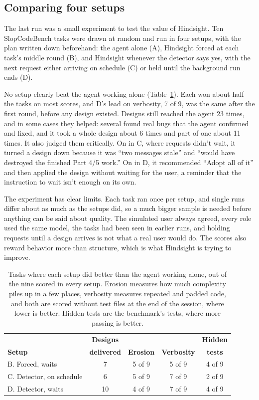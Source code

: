 \subsection{Comparing four setups}

The last run was a small experiment to test the value of Hindsight. Ten SlopCodeBench tasks were drawn at random and run in four setups, with the plan written down beforehand: the agent alone (A), Hindsight forced at each task's middle round (B), and Hindsight whenever the detector says yes, with the next request either arriving on schedule (C) or held until the background run ends (D).

No setup clearly beat the agent working alone (Table~\ref{tab:compare}). Each won about half the tasks on most scores, and D's lead on verbosity, 7 of 9, was the same after the first round, before any design existed. Designs still reached the agent 23 times, and in some cases they helped: several found real bugs that the agent confirmed and fixed, and it took a whole design about 6 times and part of one about 11 times. It also judged them critically. On  in C, where requests didn't wait, it turned a design down because it was ``two messages stale'' and ``would have destroyed the finished Part 4/5 work.'' On  in D, it recommended ``Adopt all of it'' and then applied the design without waiting for the user, a reminder that the instruction to wait isn't enough on its own.

The experiment has clear limits. Each task ran once per setup, and single runs differ about as much as the setups did, so a much bigger sample is needed before anything can be said about quality. The simulated user always agreed, every role used the same model, the tasks had been seen in earlier runs, and holding requests until a design arrives is not what a real user would do. The scores also reward behavior more than structure, which is what Hindsight is trying to improve.

\begin{table}[t]
  \centering
  \small
  \begin{tabular}{@{}l c c c c@{}}
    \toprule
    & \textbf{Designs} & & & \textbf{Hidden} \\
    \textbf{Setup} & \textbf{delivered} & \textbf{Erosion} & \textbf{Verbosity} & \textbf{tests} \\
    \midrule
    B. Forced, waits & 7 & 5 of 9 & 5 of 9 & 4 of 9 \\
    C. Detector, on schedule & 6 & 5 of 9 & 7 of 9 & 2 of 9 \\
    D. Detector, waits & 10 & 4 of 9 & 7 of 9 & 4 of 9 \\
    \bottomrule
  \end{tabular}
  \caption{Tasks where each setup did better than the agent working alone, out of the nine scored in every setup. Erosion measures how much complexity piles up in a few places, verbosity measures repeated and padded code, and both are scored without test files at the end of the session, where lower is better. Hidden tests are the benchmark's tests, where more passing is better.}
  \label{tab:compare}
\end{table}
